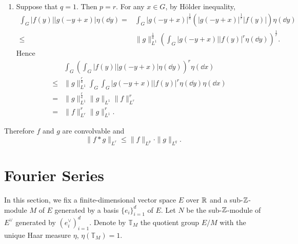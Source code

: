 \begin{proofenv}
\begin{enumerate}
\begin{enumerate}
$$\begin{aligned}
                        \int_G\int_G |f(y)| |g(-y+x)|^r \eta(\dd y)\eta(\dd x)\\
                        = & \|f\|_{L^1}^{\frac{r}{b}} \|f\|_{L^1}\|g\|_{L^r}^r\\
                        = & \|f\|_{L^1}^r\|g\|_{L^r}^r.
                    \end{aligned}$$
                \item Suppose that $q=1$. Then $p=r$.
                    For any $x \in G$, by Hölder inequality,
                    $$\begin{aligned}
                        \int_G |f(y)| |g(-y+x)| \eta(\dd y)
                        = & \int_G |g(-y+x)|^{\frac{1}{a}}\left(|g(-y+x)|^{\frac{1}{r}} |f(y)|\right)\eta(\dd y)\\
                        \le & \|g\|_{L^1}^{\frac{1}{a}}
                        \left(\int_G |g(-y+x)| |f(y)|^r \eta(\dd y)\right)^{\frac{1}{r}}.
                    \end{aligned}$$
                    Hence
                    $$\begin{aligned}
                        & \int_G\left(\int_G |f(y)| |g(-y+x)|\eta(\dd y)\right)^r \eta(\dd x)\\
                        \le & \|g\|_{L^1}^{\frac{r}{a}}
                        \int_G\int_G |g(-y+x)| |f(y)|^r \eta(\dd y)\eta(\dd x)\\
                        = & \|g\|_{L^1}^{\frac{r}{a}} \|g\|_{L^1}\|f\|_{L^r}^r\\
                        = & \|f\|_{L^r}^r\|g\|_{L^1}^r.
                    \end{aligned}$$
            \end{enumerate}
            Therefore $f$ and $g$ are convolvable and
            $$\|f*g\|_{L^r} \le \|f\|_{L^p} \cdot \|g\|_{L^q}.$$
    \end{enumerate}
\end{proofenv}


\section{Fourier Series}
In this section, we fix a finite-dimensional vector space $E$ over $\mathbb{R}$ and a sub-$\mathbb{Z}$-module $M$ of $E$ generated by a basis $\{e_i\}_{i=1}^{d}$ of $E$.
Let $N$ be the sub-$\mathbb{Z}$-module of $E^\vee$ generated by $(e^\vee_i)_{i=1}^{d}$.
Denote by $\mathbb{T}_{M}$ the quotient group $E/M$ with the unique Haar measure $\eta$, $\eta(\mathbb{T}_M) = 1$.


